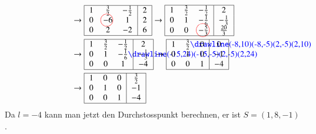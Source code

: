 \begin{beispiel}
\begin{align*}
\begin{tabular}{|>{$}c<{$}>{$}c<{$}>{$}c<{$}|>{$}c<{$}|}
\hline
\end{tabular}
&
\rightarrow
\begin{tabular}{|>{$}c<{$}>{$}c<{$}>{$}c<{$}|>{$}c<{$}|}
\hline
 1& \frac32&-\frac12&2\\
 0&-6%
\begin{picture}(0,0)
\color{red}\put(-7,3){\circle{15}}
\end{picture}%
& 1&2\\
 0& 2&-2&6\\
\hline
\end{tabular}
\rightarrow
\begin{tabular}{|>{$}c<{$}>{$}c<{$}>{$}c<{$}|>{$}c<{$}|}
\hline
 1& \frac32&-\frac12&2\\
 0& 1&-\frac16&-\frac13\\
 0& 0&-\frac53%
\begin{picture}(0,0)
\color{red}\put(-7,3){\circle{16}}
\end{picture}%
&\frac{20}3\\
\hline
\end{tabular}
\\
&
\rightarrow
\begin{tabular}{|>{$}c<{$}>{$}c<{$}>{$}c<{$}|>{$}c<{$}|}
\hline
 1& \frac32&-\frac12&2\\
 0& 1&-\frac16%
\begin{picture}(0,0)
\color{blue}\drawline(-15,24)(-15,-5)(2,-5)(2,24)
\end{picture}
&-\frac13\\
 0& 0& 1&-4\\
\hline
\end{tabular}
\rightarrow
\begin{tabular}{|>{$}c<{$}>{$}c<{$}>{$}c<{$}|>{$}c<{$}|}
\hline
 1& \frac32%
\begin{picture}(0,0)
\color{blue}\drawline(-8,10)(-8,-5)(2,-5)(2,10)
\end{picture}%
& 0&0\\
 0& 1& 0&-1\\
 0& 0& 1&-4\\
\hline
\end{tabular}
\\
&
\rightarrow
\begin{tabular}{|>{$}c<{$}>{$}c<{$}>{$}c<{$}|>{$}c<{$}|}
\hline
 1& 0& 0&\frac32\\
 0& 1& 0&-1\\
 0& 0& 1&-4\\
\hline
\end{tabular}
\end{align*}
Da $l=-4$ kann man jetzt den Durchstosspunkt berechnen, er ist $S=(1,8,-1)$.
\end{beispiel}

